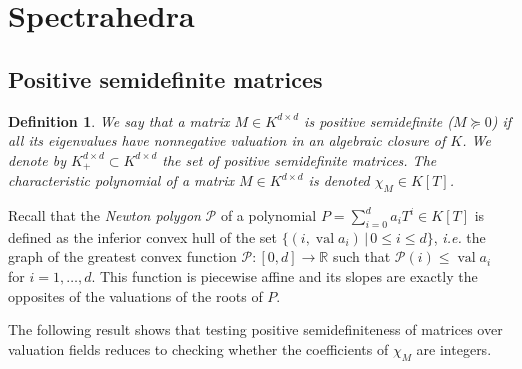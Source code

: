 \documentclass[a4paper,12pt]{article}
\newtheorem{definition}[theorem]{Definition}
\newcommand{\R}{\mathbb{R}} %
\DeclareMathOperator{\val}{val}
\begin{document}
\section{Spectrahedra}

\subsection{Positive semidefinite matrices}
\newcommand\Mat{Positive semidefinite matrix }
\newcommand\mats{positive semidefinite matrices }
\newcommand\Mats{positive semidefinite matrices }

\begin{definition}
  We say that a matrix $M \in K^{d \times d}$ is \emph{positive semidefinite} ($M \succeq 0$)
  if all its eigenvalues have nonnegative valuation in an algebraic closure of $K$.
  We denote by $K^{d \times d}_+ \subset K^{d\times d}$ the set of positive semidefinite matrices.
  The characteristic polynomial of a matrix $M \in K^{d\times d}$ is denoted $\chi_M \in K[T]$.
\end{definition}

Recall that the \emph{Newton polygon} $\mathcal{P}$ of a polynomial $P = \sum_{i=0}^{d} a_i T^i \in K[T]$ is
defined as the inferior convex hull of the set $\{(i, \val a_i) \,|\, 0 \le i \le d\}$, {\it i.e.} the
graph of the greatest convex function $\mathcal{P} : [0,d] \to \R$ such that $\mathcal{P}(i) \leq \val a_i$
for $i=1,\ldots,d$. This function is piecewise affine and its slopes are exactly the opposites of the valuations
of the roots of $P$.

The following result shows that testing positive semidefiniteness of matrices over
valuation fields reduces to checking whether the coefficients of $\chi_M$ are integers.
\end{document}
